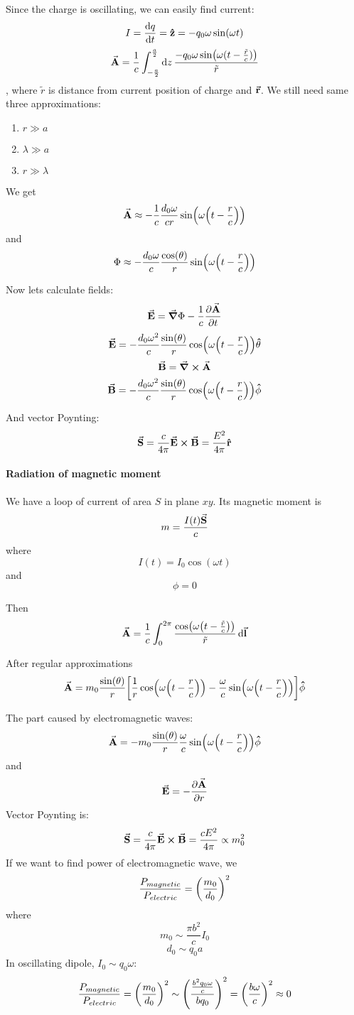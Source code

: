 Since the charge is oscillating, we can easily find current:
$$I = \dv{q}{t} = \vu{z} = -q_0 \omega \sin(\omega t)$$
$$\va{A} = \frac{1}{c} \int_{-\frac{a}{2}}^{\frac{a}{2}} \dd{z} \frac{-q_0 \omega \sin(\omega (t-\frac{\tilde{r}}{c}))}{\tilde{r}} $$
, where $\tilde{r}$ is distance from current position of charge and $\va{r}$.
We still need same three approximations:
\begin{enumerate}
	\item $r\gg a$
	\item $\lambda \gg a$
	\item $r \gg \lambda$
\end{enumerate}

We get
$$\va{A} \approx -\frac{1}{c}\frac{d_0\omega}{cr} \sin(\omega\qty(t-\frac{r}{c}))$$
and
$$\Phi \approx -\frac{d_0\omega}{c}\frac{\cos(\theta)}{r} \sin(\omega\qty(t-\frac{r}{c}))$$

Now lets calculate fields:
$$\va{E} = \grad{\Phi} - \frac{1}{c} \pdv{\va{A}}{t}$$
$$\va{E} = -\frac{d_0 \omega^2}{c} \frac{\sin(\theta)}{r} \cos(\omega\qty(t-\frac{r}{c})) \vu{\theta}$$
$$\va{B}= \curl{\va{A}}$$
$$\va{B} = -\frac{d_0 \omega^2}{c} \frac{\sin(\theta)}{r} \cos(\omega\qty(t-\frac{r}{c})) \vu{\phi}$$

And vector Poynting:
$$\va{S} = \frac{c}{4\pi} \va{E} \cross \va{B}= \frac{E^2}{4\pi} \vu{r}$$

\paragraph{Radiation of magnetic moment}
We have a loop of current of area $S$ in plane $xy$. Its magnetic moment is
$$m = \frac{I(t)\va{S}}{c}$$
where
$$I(t) = I_0 \cos(\omega t)$$
and
$$\phi=0$$

Then
$$\va{A} = \frac{1}{c} \int_0^{2\pi} \frac{\cos(\omega\qty(t-\frac{\tilde{r}}{c}))}{\tilde{r}} \dd{\va{l}}$$

After regular approximations
$$\va{A} = m_0\frac{\sin(\theta)}{r} \qty[\frac{1}{r} \cos(\omega\qty(t-\frac{r}{c})) - \frac{\omega}{c}\sin(\omega\qty(t-\frac{r}{c}))]\vu{\phi}$$

The part caused by electromagnetic waves:
$$\va{A} =  -m_0\frac{\sin(\theta)}{r} \frac{\omega}{c}\sin(\omega\qty(t-\frac{r}{c}))\vu{\phi}$$
and
$$\va{E} = -\pdv{\va{A}}{r}$$
Vector Poynting is:
$$\va{S} =\frac{c}{4\pi} \va{E} \cross \va{B} = \frac{cE^2}{4\pi}\propto m_0^2$$
If we want to find power of electromagnetic wave, we
$$\frac{P_{magnetic}}{P_{electric}} = \qty(\frac{m_0}{d_0})^2$$
where
$$m_0 \sim \frac{\pi b^2}{c} I_0$$
$$d_0 \sim q_0a$$
In oscillating dipole, $I_0 \sim q_0 \omega$:
$$\frac{P_{magnetic}}{P_{electric}} = \qty(\frac{m_0}{d_0})^2 \sim \qty(\frac{\frac{b^2q_0 \omega}{c}}{bq_0})^2 = \qty(\frac{b\omega}{c})^2 \approx 0$$
